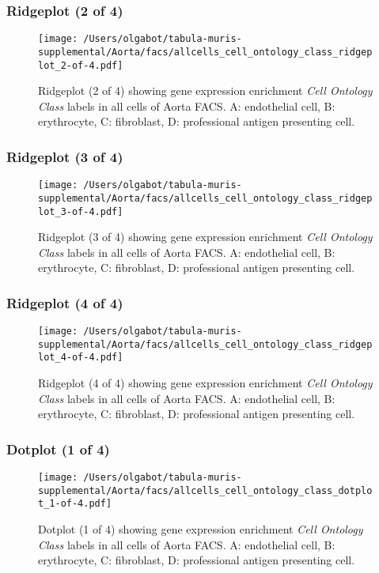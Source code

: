 \clearpage

\subsubsection{Ridgeplot (2 of 4)}
\begin{figure}[h]
\centering
\texttt{[image: /Users/olgabot/tabula-muris-supplemental/Aorta/facs/allcells\_cell\_ontology\_class\_ridgeplot\_2-of-4.pdf]}

\caption{ Ridgeplot (2 of 4)  showing gene expression enrichment \emph{Cell Ontology Class} labels in all cells of Aorta FACS. A: endothelial cell, B: erythrocyte, C: fibroblast, D: professional antigen presenting cell.}
\end{figure}


\clearpage

\subsubsection{Ridgeplot (3 of 4)}
\begin{figure}[h]
\centering
\texttt{[image: /Users/olgabot/tabula-muris-supplemental/Aorta/facs/allcells\_cell\_ontology\_class\_ridgeplot\_3-of-4.pdf]}

\caption{ Ridgeplot (3 of 4)  showing gene expression enrichment \emph{Cell Ontology Class} labels in all cells of Aorta FACS. A: endothelial cell, B: erythrocyte, C: fibroblast, D: professional antigen presenting cell.}
\end{figure}


\clearpage

\subsubsection{Ridgeplot (4 of 4)}
\begin{figure}[h]
\centering
\texttt{[image: /Users/olgabot/tabula-muris-supplemental/Aorta/facs/allcells\_cell\_ontology\_class\_ridgeplot\_4-of-4.pdf]}

\caption{ Ridgeplot (4 of 4)  showing gene expression enrichment \emph{Cell Ontology Class} labels in all cells of Aorta FACS. A: endothelial cell, B: erythrocyte, C: fibroblast, D: professional antigen presenting cell.}
\end{figure}


\clearpage

\subsubsection{Dotplot (1 of 4)}
\begin{figure}[h]
\centering
\texttt{[image: /Users/olgabot/tabula-muris-supplemental/Aorta/facs/allcells\_cell\_ontology\_class\_dotplot\_1-of-4.pdf]}

\caption{ Dotplot (1 of 4)  showing gene expression enrichment \emph{Cell Ontology Class} labels in all cells of Aorta FACS. A: endothelial cell, B: erythrocyte, C: fibroblast, D: professional antigen presenting cell.}
\end{figure}


